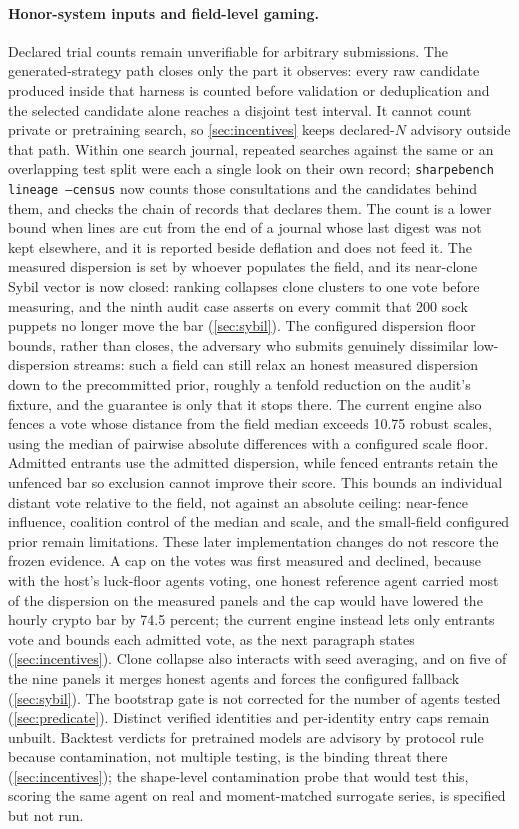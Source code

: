\paragraph{Honor-system inputs and field-level gaming.} Declared trial counts remain unverifiable for arbitrary submissions. The generated-strategy path closes only the part it observes: every raw candidate produced inside that harness is counted before validation or deduplication and the selected candidate alone reaches a disjoint test interval. It cannot count private or pretraining search, so \cref{sec:incentives} keeps declared-$N$ advisory outside that path. Within one search journal, repeated searches against the same or an overlapping test split were each a single look on their own record; \texttt{sharpebench lineage --census} now counts those consultations and the candidates behind them, and checks the chain of records that declares them. The count is a lower bound when lines are cut from the end of a journal whose last digest was not kept elsewhere, and it is reported beside deflation and does not feed it. The measured dispersion is set by whoever populates the field, and its near-clone Sybil vector is now closed: ranking collapses clone clusters to one vote before measuring, and the ninth audit case asserts on every commit that 200 sock puppets no longer move the bar (\cref{sec:sybil}). The configured dispersion floor bounds, rather than closes, the adversary who submits genuinely dissimilar low-dispersion streams: such a field can still relax an honest measured dispersion down to the precommitted prior, roughly a tenfold reduction on the audit's fixture, and the guarantee is only that it stops there. The current engine also fences a vote whose distance from the field median exceeds 10.75 robust scales, using the median of pairwise absolute differences with a configured scale floor. Admitted entrants use the admitted dispersion, while fenced entrants retain the unfenced bar so exclusion cannot improve their score. This bounds an individual distant vote relative to the field, not against an absolute ceiling: near-fence influence, coalition control of the median and scale, and the small-field configured prior remain limitations. These later implementation changes do not rescore the frozen evidence. A cap on the votes was first measured and declined, because with the host's luck-floor agents voting, one honest reference agent carried most of the dispersion on the measured panels and the cap would have lowered the hourly crypto bar by 74.5 percent; the current engine instead lets only entrants vote and bounds each admitted vote, as the next paragraph states (\cref{sec:incentives}). Clone collapse also interacts with seed averaging, and on five of the nine panels it merges honest agents and forces the configured fallback (\cref{sec:sybil}). The bootstrap gate is not corrected for the number of agents tested (\cref{sec:predicate}). Distinct verified identities and per-identity entry caps remain unbuilt. Backtest verdicts for pretrained models are advisory by protocol rule because contamination, not multiple testing, is the binding threat there (\cref{sec:incentives}); the shape-level contamination probe that would test this, scoring the same agent on real and moment-matched surrogate series, is specified but not run.

